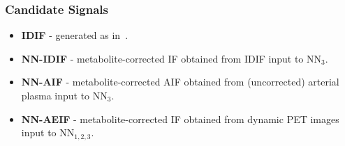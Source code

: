             \subsubsection{Candidate Signals} \label{sec:a_bayesian_neural_network-based_method_for_the_extraction_of_a_metabolite_corrected_arterial_input_function_from_dynamic_pbr28_pet_appendix_methods_evaluation_candidate_signals}
                \begin{itemize}
                    \item \textbf{\gls{IDIF}} - generated as in~.
                    
                    \item \textbf{\gls{NN}-\gls{IDIF}} - metabolite-corrected \gls{IF} obtained from \gls{IDIF} input to \gls{NN}$_3$.
                    
                    \item \textbf{\gls{NN}-\gls{AIF}} - metabolite-corrected \gls{AIF} obtained from (uncorrected) arterial plasma input to \gls{NN}$_3$.
                    
                    \item \textbf{\gls{NN}-\gls{AE}\gls{IF}} - metabolite-corrected \gls{IF} obtained from dynamic \gls{PET} images input to \gls{NN}$_{1,2,3}$.
                \end{itemize}
    
